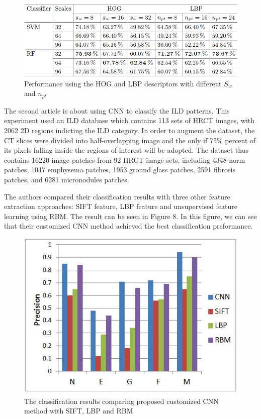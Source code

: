\documentclass[10pt,twocolumn,letterpaper]{article}
\begin{document}
\begin{figure}[t]
	\begin{center}
		\includegraphics[width=0.8\linewidth]{10}
	\end{center}
	\caption{Performance using the HOG and LBP descriptors with different \textit{$S_w$} and \textit{$n_{pt}$}} 
	\label{fig:long}
	\label{fig:onecol}
\end{figure}

The second article\cite{li2014medical} is about using CNN to classify the ILD patterns. This experiment used an ILD database which contains 113 sets of HRCT images, with 2062 2D regions indicting the ILD category. In order to augment the dataset, the CT slices were divided into half-overlapping image and the only if 75\% percent of its pixels falling inside the regions of interest will be adopted. The dataset thus contains 16220 image patches from 92 HRCT image sets,
including 4348 norm patches, 1047 emphysema patches, 1953 ground glass patches, 2591 fibrosis patches, and 6281 micronodules patches. 

The authors compared their classification results with three other feature extraction approaches: SIFT feature, LBP feature and unsupervised feature learning using RBM. The result can be seen in Figure 8. In this figure, we can see that their customized CNN method achieved the best classification preformance.

\begin{figure}[t]
	\begin{center}
		\includegraphics[width=0.8\linewidth]{11}
	\end{center}
	\caption{The classification results comparing proposed customized CNN method with SIFT, LBP and RBM} 
	\label{fig:long}
	\label{fig:onecol}
\end{figure}
\end{document}

